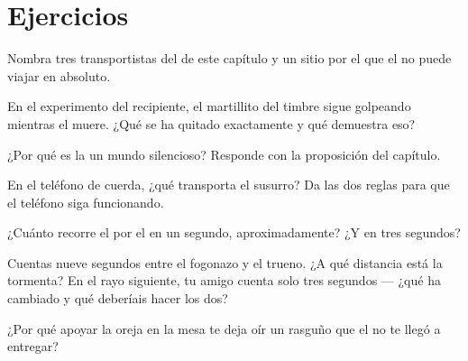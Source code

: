 \section{Ejercicios}

\begin{exercise}[$\star$]\label{exo:g4:how-sound-travels:1}
Nombra tres transportistas del  de este capítulo y un sitio por
el que el  no puede viajar en absoluto.
\end{exercise}

\begin{exercise}[$\star$]\label{exo:g4:how-sound-travels:2}
En el experimento del recipiente, el martillito del timbre sigue
golpeando mientras el  muere. ¿Qué se ha quitado exactamente y
qué demuestra eso?
\end{exercise}

\begin{exercise}[$\star$]\label{exo:g4:how-sound-travels:3}
¿Por qué es la  un mundo silencioso? Responde con la proposición
del capítulo.
\end{exercise}

\begin{exercise}[$\star$]\label{exo:g4:how-sound-travels:4}
En el teléfono de cuerda, ¿qué transporta el susurro? Da las dos
reglas para que el teléfono siga funcionando.
\end{exercise}

\begin{exercise}[$\star$]\label{exo:g4:how-sound-travels:5}
¿Cuánto recorre el  por el  en un segundo,
aproximadamente? ¿Y en tres segundos?
\end{exercise}

\begin{exercise}[$\star$]\label{exo:g4:how-sound-travels:6}
Cuentas nueve segundos entre el fogonazo y el trueno. ¿A qué distancia
está la tormenta? En el rayo siguiente, tu amigo cuenta solo tres
segundos --- ¿qué ha cambiado y qué deberíais hacer los dos?
\end{exercise}

\begin{exercise}[$\star$]\label{exo:g4:how-sound-travels:7}
¿Por qué apoyar la oreja en la mesa te deja oír un rasguño que el
 no te llegó a entregar?
\end{exercise}

